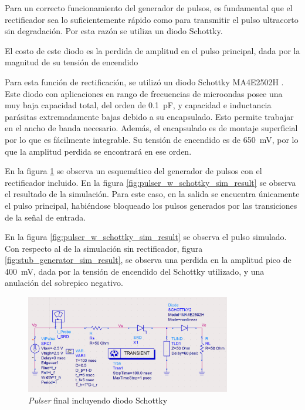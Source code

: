 Para un correcto funcionamiento del generador de pulsos, es fundamental que el
rectificador sea lo suficientemente rápido como para transmitir el pulso
ultracorto sin degradación. Por esta razón se utiliza un diodo Schottky.

El costo de este diodo es la perdida de amplitud en el pulso principal, dada por
la magnitud de su tensión de encendido

Para esta función de rectificación, se utilizó un diodo Schottky MA4E2502H
\cite{MA4E2502H-datasheet}. Este diodo con aplicaciones en rango de frecuencias
de microondas posee una muy baja capacidad total, del orden de
\qty{0.1}{\pico\farad}, y capacidad e inductancia parásitas extremadamente bajas
debido a su encapsulado. Esto permite trabajar en el ancho de banda necesario.
Además, el encapsulado es de montaje superficial por lo que es fácilmente
integrable. Su tensión de encendido es de \qty{650}{\milli\volt}, por lo que la
amplitud perdida se encontrará en ese orden.

En la figura \ref{fig:pulser_w_schottky_sch} se observa un esquemático del
generador de pulsos con el rectificador incluido. En la figura
\ref{fig:pulser_w_schottky_sim_result} se observa el resultado de la
simulación. Para este caso, en la salida se encuentra únicamente el pulso
principal, habiéndose bloqueado los pulsos generados por las transiciones de la
señal de entrada.

En la figura \ref{fig:pulser_w_schottky_sim_result} se observa el pulso
simulado. Con respecto al de la simulación sin rectificador, figura
\ref{fig:stub_generator_sim_result}, se observa una perdida en la amplitud pico de
\qty{400}{\milli\volt}, dada por la tensión de encendido del Schottky
utilizado, y una anulación del sobrepico negativo.

\begin{figure}[tbp]
    \centering
    \includegraphics[width=0.8\textwidth]{images/pulser_w_schottky_sch.png}
    \caption{\textit{Pulser} final incluyendo diodo Schottky}
    \label{fig:pulser_w_schottky_sch}
\end{figure}

